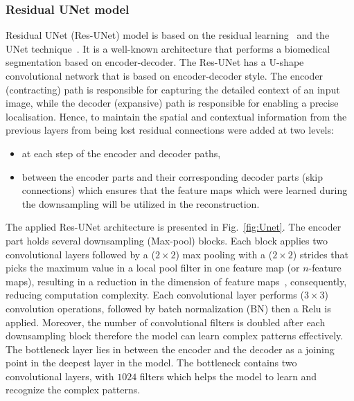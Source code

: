 \subsubsection{Residual UNet model}
Residual UNet (Res-UNet) model is based on the residual learning~\cite{He2016} and the UNet technique~\cite{Ronneberger2015}. 
It is a well-known architecture that performs a biomedical segmentation based on encoder-decoder. 
The Res-UNet has a U-shape convolutional network that is based on encoder-decoder style. 
The encoder (contracting) path is responsible for capturing the detailed context of an input image, while the decoder (expansive) path is responsible for enabling a precise localisation. 
Hence, to maintain the spatial and contextual information from the previous layers from being lost residual connections were added at two levels:
\begin{itemize}
	\item at each step of the encoder and decoder paths,
	\item between the encoder parts and their corresponding decoder parts (skip connections) which ensures that the feature maps which were learned during the downsampling will be utilized in the reconstruction. 
\end{itemize}
The applied Res-UNet architecture is presented in Fig.~\ref{fig:Unet}.
The encoder part holds several downsampling (Max-pool) blocks. 
Each block applies two convolutional layers followed by a (\(2\times2\)) max pooling with a (\(2\times2\)) strides that picks the maximum value in a local pool filter in one feature map (or \(n\)-feature maps), resulting in a reduction in the dimension of feature maps~\cite{Lecun2015}, consequently, reducing computation complexity.
Each convolutional layer performs (\(3\times3\)) convolution operations, followed by batch normalization (BN) then a Relu is applied.
Moreover, the number of convolutional filters is doubled after each downsampling block therefore the model can learn complex patterns effectively. 
The bottleneck layer lies in between the encoder and the decoder as a joining point in the deepest layer in the model.
The bottleneck contains two convolutional layers, with \(1024\) filters which helps the model to learn and recognize the complex patterns.
